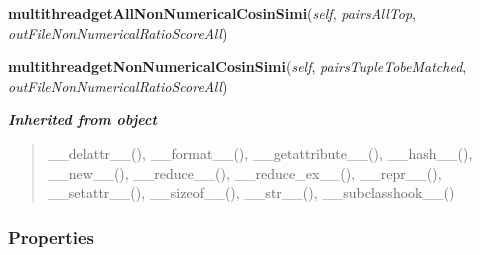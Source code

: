     \vspace{0.5ex}

\hspace{.8\funcindent}\begin{boxedminipage}{\funcwidth}

    \raggedright \textbf{multithreadgetAllNonNumericalCosinSimi}(\textit{self}, \textit{pairsAllTop}, \textit{outFileNonNumericalRatioScoreAll})

\setlength{\parskip}{2ex}
\setlength{\parskip}{1ex}
    \end{boxedminipage}

    \label{nonNumericalRecordPairsMatching:nonNumericalRecordPairsMatching:multithreadgetNonNumericalCosinSimi}

    \vspace{0.5ex}

\hspace{.8\funcindent}\begin{boxedminipage}{\funcwidth}

    \raggedright \textbf{multithreadgetNonNumericalCosinSimi}(\textit{self}, \textit{pairsTupleTobeMatched}, \textit{outFileNonNumericalRatioScoreAll})

\setlength{\parskip}{2ex}
\setlength{\parskip}{1ex}
    \end{boxedminipage}


\large{\textbf{\textit{Inherited from object}}}

\begin{quote}
\_\_delattr\_\_(), \_\_format\_\_(), \_\_getattribute\_\_(), \_\_hash\_\_(), \_\_new\_\_(), \_\_reduce\_\_(), \_\_reduce\_ex\_\_(), \_\_repr\_\_(), \_\_setattr\_\_(), \_\_sizeof\_\_(), \_\_str\_\_(), \_\_subclasshook\_\_()
\end{quote}


  \subsubsection{Properties}

